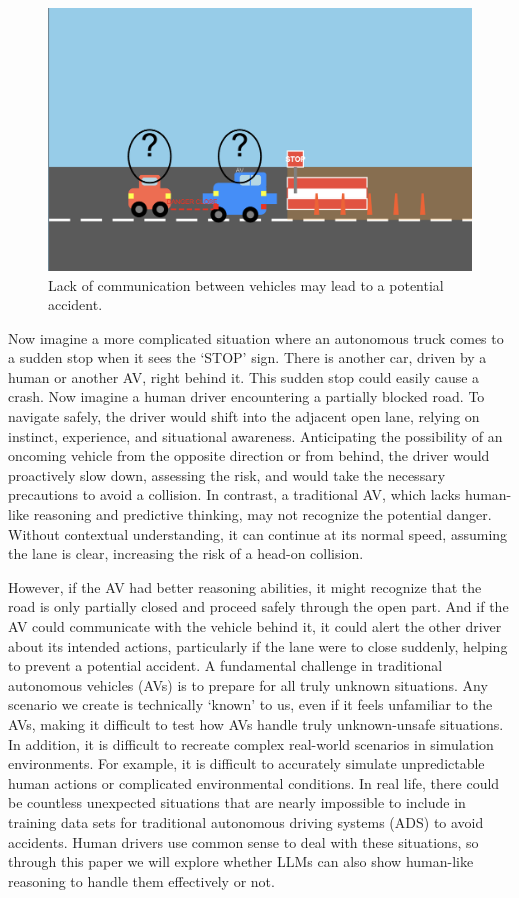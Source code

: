\documentclass[conference]{IEEEtran}
\begin{document}
\begin{figure}[ht]
    \centering
    \includegraphics[width= .9\linewidth]{s1.png}
    \caption{Lack of communication between vehicles may lead to a potential accident.}
    \label{fig:enter-label-unique-2}
\end{figure}

Now imagine a more complicated situation where an autonomous truck comes to a sudden stop when it sees the `STOP' sign. There is another car, driven by a human or another AV, right behind it. This sudden stop could easily cause a crash. 
Now imagine a human driver encountering a partially blocked road. To navigate safely, the driver would shift into the adjacent open lane, relying on instinct, experience, and situational awareness. Anticipating the possibility of an oncoming vehicle from the opposite direction or from behind, the driver would proactively slow down, assessing the risk, and would take the necessary precautions to avoid a collision. In contrast, a traditional AV, which lacks human-like reasoning and predictive thinking, may not recognize the potential danger. Without contextual understanding, it can continue at its normal speed, assuming the lane is clear, increasing the risk of a head-on collision.

However, if the AV had better reasoning abilities, it might recognize that the road is only partially closed and proceed safely through the open part. And if the AV could communicate with the vehicle behind it, it could alert the other driver about its intended actions, particularly if the lane were to close suddenly, helping to prevent a potential accident.
A fundamental challenge in traditional autonomous vehicles (AVs) is to prepare for all truly unknown situations\cite{singh2024systematic}. Any scenario we create is technically `known' to us, even if it feels unfamiliar to the AVs, making it difficult to test how AVs handle truly unknown-unsafe situations. In addition, it is difficult to recreate complex real-world scenarios in simulation environments. For example, it is difficult to accurately simulate unpredictable human actions or complicated environmental conditions. In real life, there could be countless unexpected situations that are nearly impossible to include in training data sets for traditional autonomous driving systems (ADS) to avoid accidents. Human drivers use common sense to deal with these situations, so through this paper we will explore whether LLMs can also show human-like reasoning to handle them effectively or not. 
\end{document}

